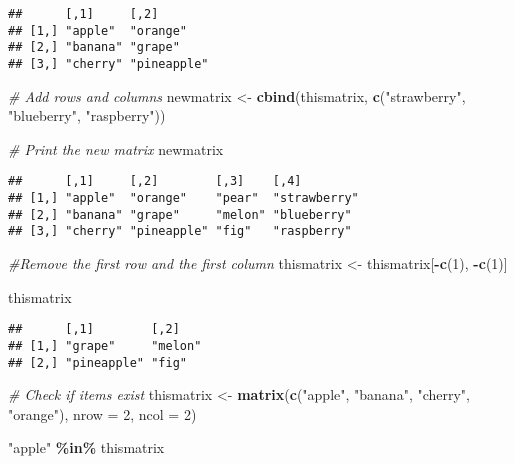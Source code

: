 \documentclass[
]{article}
\newenvironment{Shaded}{\begin{snugshade}}{\end{snugshade}}
\newcommand{\AttributeTok}[1]{\textcolor[rgb]{0.13,0.29,0.53}{#1}}
\newcommand{\CommentTok}[1]{\textcolor[rgb]{0.56,0.35,0.01}{\textit{#1}}}
\newcommand{\DecValTok}[1]{\textcolor[rgb]{0.00,0.00,0.81}{#1}}
\newcommand{\FunctionTok}[1]{\textcolor[rgb]{0.13,0.29,0.53}{\textbf{#1}}}
\newcommand{\NormalTok}[1]{#1}
\newcommand{\OtherTok}[1]{\textcolor[rgb]{0.56,0.35,0.01}{#1}}
\newcommand{\SpecialCharTok}[1]{\textcolor[rgb]{0.81,0.36,0.00}{\textbf{#1}}}
\newcommand{\StringTok}[1]{\textcolor[rgb]{0.31,0.60,0.02}{#1}}
\begin{document}
\begin{verbatim}
##      [,1]     [,2]       
## [1,] "apple"  "orange"   
## [2,] "banana" "grape"    
## [3,] "cherry" "pineapple"
\end{verbatim}

\begin{Shaded}
\begin{Highlighting}[]
\CommentTok{\# Add rows and columns}
\NormalTok{newmatrix }\OtherTok{\textless{}{-}} \FunctionTok{cbind}\NormalTok{(thismatrix, }\FunctionTok{c}\NormalTok{(}\StringTok{"strawberry"}\NormalTok{, }\StringTok{"blueberry"}\NormalTok{, }\StringTok{"raspberry"}\NormalTok{))}

\CommentTok{\# Print the new matrix}
\NormalTok{newmatrix}
\end{Highlighting}
\end{Shaded}

\begin{verbatim}
##      [,1]     [,2]        [,3]    [,4]        
## [1,] "apple"  "orange"    "pear"  "strawberry"
## [2,] "banana" "grape"     "melon" "blueberry" 
## [3,] "cherry" "pineapple" "fig"   "raspberry"
\end{verbatim}

\begin{Shaded}
\begin{Highlighting}[]
\CommentTok{\#Remove the first row and the first column}
\NormalTok{thismatrix }\OtherTok{\textless{}{-}}\NormalTok{ thismatrix[}\SpecialCharTok{{-}}\FunctionTok{c}\NormalTok{(}\DecValTok{1}\NormalTok{), }\SpecialCharTok{{-}}\FunctionTok{c}\NormalTok{(}\DecValTok{1}\NormalTok{)]}

\NormalTok{thismatrix}
\end{Highlighting}
\end{Shaded}

\begin{verbatim}
##      [,1]        [,2]   
## [1,] "grape"     "melon"
## [2,] "pineapple" "fig"
\end{verbatim}

\begin{Shaded}
\begin{Highlighting}[]
\CommentTok{\# Check if items exist}
\NormalTok{thismatrix }\OtherTok{\textless{}{-}} \FunctionTok{matrix}\NormalTok{(}\FunctionTok{c}\NormalTok{(}\StringTok{"apple"}\NormalTok{, }\StringTok{"banana"}\NormalTok{, }\StringTok{"cherry"}\NormalTok{, }\StringTok{"orange"}\NormalTok{), }\AttributeTok{nrow =} \DecValTok{2}\NormalTok{, }\AttributeTok{ncol =} \DecValTok{2}\NormalTok{)}

\StringTok{"apple"} \SpecialCharTok{\%in\%}\NormalTok{ thismatrix}
\end{Highlighting}
\end{Shaded}
\end{document}
